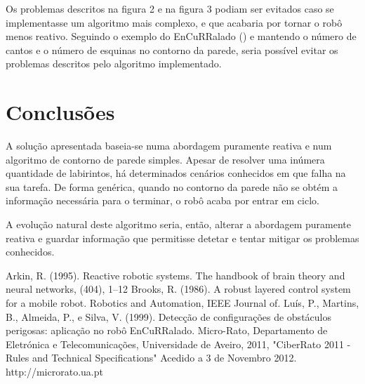\documentclass[citeauthoryear]{llncs} %
\begin{document}
Os problemas descritos na figura 2 e na figura 3 podiam ser evitados caso se implementasse um algoritmo mais complexo, e que acabaria por tornar o robô menos reativo. Seguindo o exemplo do EnCuRRalado (\cite{encur}) e mantendo o número de cantos e o número de esquinas no contorno da parede, seria possível evitar os problemas descritos pelo algoritmo implementado.

\section{Conclusões}

A solução apresentada baseia-se numa abordagem puramente reativa e num algoritmo de contorno de parede simples. Apesar de resolver uma inúmera quantidade de labirintos, há determinados cenários conhecidos em que falha na sua tarefa. De forma genérica, quando no contorno da parede não se obtém a informação necessária para o terminar, o robô acaba por entrar em ciclo.

A evolução natural deste algoritmo seria, então, alterar a abordagem puramente reativa e guardar informação que permitisse detetar e tentar mitigar os problemas conhecidos.

\begingroup
\renewcommand\refname{Referências}
\begin{thebibliography}{}
Arkin, R. (1995). Reactive robotic systems. The handbook of brain theory and neural networks, (404), 1–12
Brooks, R. (1986). A robust layered control system for a mobile robot. Robotics and Automation, IEEE Journal of.
Luís, P., Martins, B., Almeida, P., e Silva, V. (1999). Detecção de configurações de obstáculos perigosas: aplicação no robô EnCuRRalado. 
Micro-Rato, Departamento de Eletrónica e Telecomunicações, Universidade de Aveiro, 2011, "CiberRato 2011 - Rules and Technical Specifications" Acedido a 3 de Novembro 2012. http://microrato.ua.pt
\end{thebibliography}
\endgroup
\end{document}
